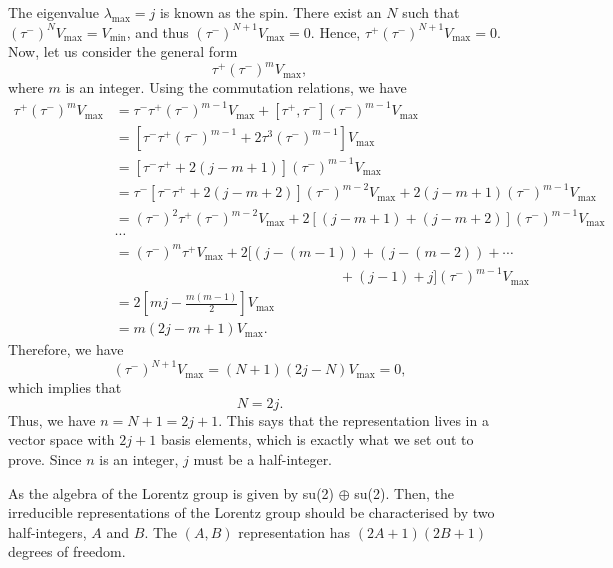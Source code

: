 \documentclass[11pt]{article}
\theoremstyle{definition}
\begin{document}
\begin{tcolorbox}[breakable, colback=yellow!20!white, colframe=black, boxrule=1pt]
    The eigenvalue $\lambda_\text{max}=j$ is known as the spin. There exist an $N$ such that $(\tau^-)^N V_\text{max} = V_\text{min}$, and thus $(\tau^-)^{N+1} V_\text{max} = 0$. Hence, $\tau^+(\tau^-)^{N+1} V_\text{max} = 0$. Now, let us consider the general form
    \begin{equation}
        \tau^+(\tau^-)^{m} V_\text{max},
    \end{equation}
    where $m$ is an integer. Using the commutation relations, we have
    \begin{equation}
        \begin{aligned}
            \tau^+(\tau^-)^{m} V_\text{max} &= \tau^-\tau^+(\tau^-)^{m-1} V_\text{max} + [\tau^+,\tau^-](\tau^-)^{m-1} V_\text{max}\\
            &= [\tau^-\tau^+(\tau^-)^{m-1} + 2\tau^3(\tau^-)^{m-1}]V_\text{max}\\
            &= [\tau^-\tau^+ + 2(j-m+1)](\tau^-)^{m-1}V_\text{max}\\
            &= \tau^-[\tau^-\tau^+ + 2(j-m+2)](\tau^-)^{m-2}V_\text{max} + 2(j-m+1)(\tau^-)^{m-1}V_\text{max}\\
            &= (\tau^-)^2\tau^+(\tau^-)^{m-2}V_\text{max} + 2[(j-m+1) + (j-m+2)](\tau^-)^{m-1}V_\text{max}\\
            & \cdots\\
            &= (\tau^-)^m\tau^+V_\text{max} + 2[(j-(m-1)) + (j-(m-2)) + \cdots \\
            & \qquad \qquad \qquad \qquad \qquad \qquad \qquad \qquad + (j - 1) + j](\tau^-)^{m-1}V_\text{max}\\
            & = 2\left[mj - \frac{m(m-1)}{2}\right]V_\text{max}\\
            &= m(2j-m+1)V_\text{max}.
        \end{aligned}
    \end{equation}
    Therefore, we have
    \begin{equation}
        (\tau^-)^{N+1} V_\text{max} = (N+1)(2j-N)V_\text{max} = 0,
    \end{equation}
    which implies that
    \begin{equation}
        N=2j.
    \end{equation}
    Thus, we have $n= N+1 = 2j+1$. This says that the representation lives in a vector space with $2j+1$ basis elements, which is exactly what we set out to prove. Since $n$ is an integer, $j$ must be a half-integer.
\end{tcolorbox}
As the algebra of the Lorentz group is given by su(2) $\oplus$ su(2). Then, the irreducible representations of the Lorentz group should be characterised by two half-integers, $A$ and $B$. The $(A,B)$ representation has $(2A+1)(2B+1)$ degrees of freedom.
\end{document}
